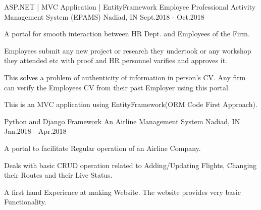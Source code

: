 \begin{cventries}

\cventry
{ASP.NET | MVC Application | EntityFramework} %
{Employee Professional Activity Management System (EPAMS)} %
{Nadiad, IN} %
{Sept.2018 - Oct.2018} %
{ %
\begin{cvitems}
\item {A portal for smooth interaction between HR Dept. and Employees of the Firm.}
\item {Employees submit any new project or research they undertook or any workshop they attended etc with proof and HR personnel varifies and approves it.}
\item {This solves a problem of authenticity of information in person's CV. Any firm can verify the Employees CV from their past Employer using this portal.}
\item {This is an MVC application using EntityFramework(ORM Code First Approach).}
\end{cvitems}
}


\cventry
{Python and Django Framework} %
{An Airline Management System} %
{Nadiad, IN} %
{Jan.2018 - Apr.2018} %
{ %
\begin{cvitems}
\item {A portal to facilitate Regular operation of an Airline Company.}
\item {Deals with basic CRUD operation related to Adding/Updating Flights, Changing their Routes and their Live Status.}
\item {A first hand Experience at making Website. The website provides very basic Functionality.}
\end{cvitems}
}


\end{cventries}